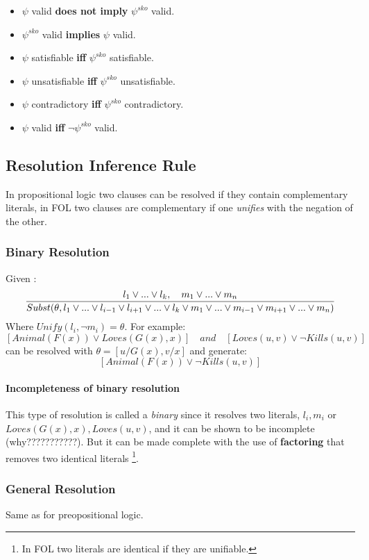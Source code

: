\documentclass[10pt,a4paper]{article}
\begin{document}
\begin{itemize}
\begin{itemize}
\item $\psi$ valid \textbf{does not imply}  $\psi^{sko}$ valid.
\item $\psi^{sko}$ valid \textbf{implies}  $\psi$ valid.

\item $\psi$ satisfiable \textbf{iff}  $\psi^{sko}$ satisfiable.
\item $\psi$ unsatisfiable \textbf{iff}  $\psi^{sko}$ unsatisfiable.
\item $\psi$ contradictory \textbf{iff}  $\psi^{sko}$ contradictory.
\item $\psi$ valid \textbf{iff}  $\neg \psi^{sko}$ valid.

\end{itemize}



\subsection{Resolution Inference Rule}
In propositional logic two clauses can be resolved if they contain complementary literals, in FOL two clauses are complementary if one \textit{unifies} with the negation of the other.

\subsubsection{Binary Resolution}
\label{sec:binaryresolution}
Given :
\[\frac{l_1\vee...\vee l_k,\quad m_1\vee...\vee m_n}{Subst(\theta,l_1 \vee ... \vee l_{i-1}\vee l_{i+1}\vee ... \vee l_k\vee m_1 \vee ... \vee m_{i-1}\vee m_{i+1}\vee ... \vee m_n)}\]
Where $Unify(l_i,\neg m_i)=\theta$. For example:
\[[Animal(F(x))\vee Loves(G(x),x)]\quad and \quad [Loves(u,v)\vee \neg Kills(u,v)]\]
can be resolved with $\theta=[u/G(x),v/x]$ and generate:
\[[Animal(F(x))\vee \neg Kills(u,v)]\]

\paragraph{Incompleteness of binary resolution}
This type of resolution is called a \textit{binary} since it resolves two literals, $l_i,m_i$ or $Loves(G(x),x),Loves(u,v)$, and it can be shown to be incomplete (why???????????). But it can be made complete with the use of \textbf{factoring} that removes two identical literals \footnote{In FOL two literals are identical if they are unifiable. }.


\subsubsection{General Resolution}
Same as for preopositional logic.



\end{itemize}
\end{document}
